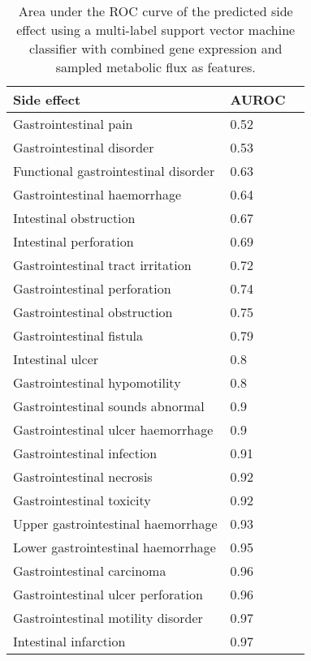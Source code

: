 \newpage
\newpage

\begin{table}[h]
\caption[Area under the ROC curve of the predicted side effect.]{Area under the ROC curve of the predicted side effect using a multi-label support vector machine classifier with combined gene expression and sampled metabolic flux as features.}
\begin{center}
	\begin{tabular*}{\textwidth}{l @{\extracolsep{\fill}} ll}
	\hline
	Side effect	                     & AUROC       \\ 
	\hline
Gastrointestinal pain                 & 0.52\\
Gastrointestinal disorder             & 0.53\\
Functional gastrointestinal disorder  & 0.63\\                 
Gastrointestinal haemorrhage          & 0.64\\    
Intestinal obstruction                & 0.67\\     
Intestinal perforation                & 0.69\\  
Gastrointestinal tract irritation     & 0.72\\ 
Gastrointestinal perforation          & 0.74\\ 
Gastrointestinal obstruction          & 0.75\\   
Gastrointestinal fistula              & 0.79\\
Intestinal ulcer                      & 0.8\\   
Gastrointestinal hypomotility         & 0.8\\        
Gastrointestinal sounds abnormal      & 0.9\\ 
Gastrointestinal ulcer haemorrhage    & 0.9\\     
Gastrointestinal infection            & 0.91\\
Gastrointestinal necrosis             & 0.92\\ %
Gastrointestinal toxicity             & 0.92\\ 
Upper gastrointestinal haemorrhage    & 0.93\\ 
Lower gastrointestinal haemorrhage    & 0.95\\
Gastrointestinal carcinoma            & 0.96\\
Gastrointestinal ulcer perforation    & 0.96\\
Gastrointestinal motility disorder    & 0.97\\ 
Intestinal infarction                 & 0.97\\

\end{tabular*}
\end{center}
\end{table}
